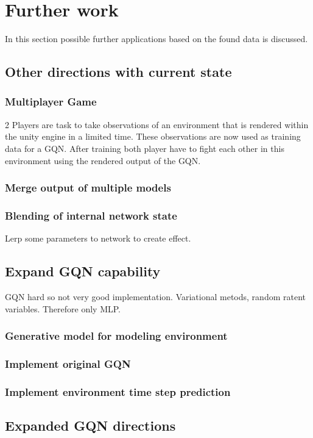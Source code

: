 \documentclass[a4paper, twoside, 10pt]{report}
\begin{document}
\chapter{Further work}
In this section possible further applications based on the found data is discussed.

\section{Other directions with current state}
\subsection{Multiplayer Game}
2 Players are task to take observations of an environment that is rendered within the unity engine in a limited time. These observations  are now used as training data for a GQN. After training both player have to fight each other in this environment using the rendered output of the GQN.

\subsection{Merge output of multiple models}
\subsection{Blending of internal network state}
Lerp some parameters to network to create effect.

\section{Expand GQN capability}
GQN hard so not very good implementation. Variational metods, random ratent variables. Therefore only MLP.

\subsection{Generative model for modeling environment}
\subsection{Implement original GQN}
\subsection{Implement environment time step prediction}
\section{Expanded GQN directions}
\end{document}
